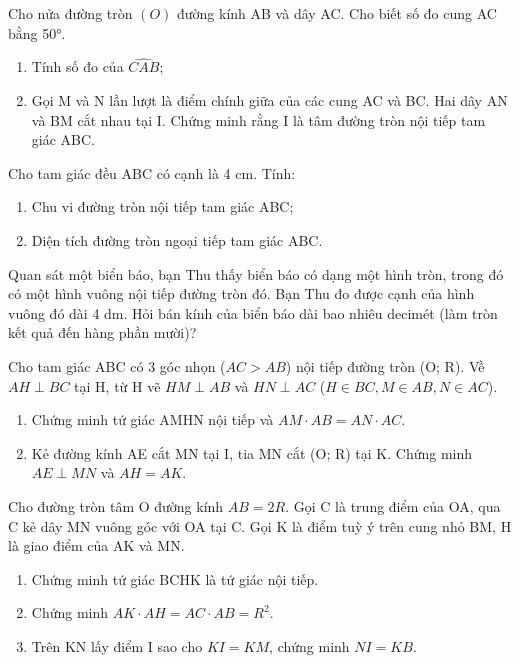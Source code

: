 \documentclass[%
    fontsize=12pt,%
    chapterprefix=false,%
    open=right,%
    twoside=false,%
    numbers=noenddot,%
    headings=optiontohead,%
    final,%
    DIV=15,%
    parskip=half %
]{scrbook}
\begin{document}
\begin{tuluan}

\item Cho nửa đường tròn $(O)$ đường kính AB và dây AC. Cho biết số đo cung AC bằng 50°.
\begin{enumerate}[label=\alph*)]
  \item[a)] Tính số đo của $ \widehat{CAB} $;
  \item[b)] Gọi M và N lần lượt là điểm chính giữa của các cung AC và BC. Hai dây AN và BM cắt nhau tại I. Chứng minh rằng I là tâm đường tròn nội tiếp tam giác ABC.
\end{enumerate}

\item Cho tam giác đều ABC có cạnh là 4 cm. Tính:
\begin{enumerate}[label=\alph*)]
  \item[a)] Chu vi đường tròn nội tiếp tam giác ABC;
  \item[b)] Diện tích đường tròn ngoại tiếp tam giác ABC.
\end{enumerate}

\item Quan sát một biển báo, bạn Thu thấy biển báo có dạng một hình tròn, trong đó có một hình vuông nội tiếp đường tròn đó. Bạn Thu đo được cạnh của hình vuông đó dài 4 dm. Hỏi bán kính của biển báo dài bao nhiêu decimét (làm tròn kết quả đến hàng phần mười)?

\item Cho tam giác ABC có 3 góc nhọn ($ AC > AB $) nội tiếp đường tròn (O; R). Về $ AH \perp BC $ tại H, từ H vẽ $ HM \perp AB $ và $ HN \perp AC $ ($ H \in BC, M \in AB, N \in AC $).
\begin{enumerate}[label=\alph*)]
  \item[a)] Chứng minh tứ giác AMHN nội tiếp và $ AM \cdot AB = AN \cdot AC $.
  \item[b)] Kẻ đường kính AE cắt MN tại I, tia MN cắt (O; R) tại K. Chứng minh $ AE \perp MN $ và $ AH = AK $.
\end{enumerate}

\item Cho đường tròn tâm O đường kính $ AB = 2R $. Gọi C là trung điểm của OA, qua C kẻ dây MN vuông góc với OA tại C. Gọi K là điểm tuỳ ý trên cung nhỏ BM, H là giao điểm của AK và MN.
\begin{enumerate}[label=\alph*)]
  \item[a)] Chứng minh tứ giác BCHK là tứ giác nội tiếp.
  \item[b)] Chứng minh $ AK \cdot AH = AC \cdot AB = R^2 $.
  \item[c)] Trên KN lấy điểm I sao cho $ KI = KM $, chứng minh $ NI = KB $.
\end{enumerate}


\end{tuluan}
\end{document}
